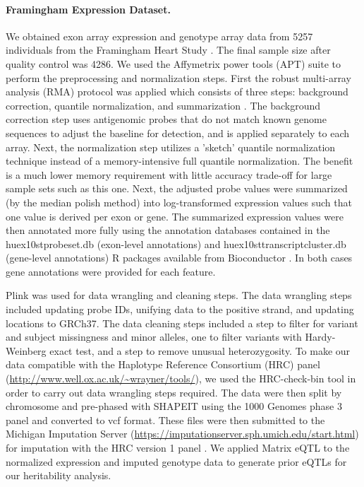 \documentclass[10pt,letterpaper]{article}
\begin{document}
\paragraph*{Framingham Expression Dataset.}\label{framingham-dataset}

We obtained exon array expression and genotype array data from 5257 individuals from the Framingham Heart Study \cite{Zhang_2015}. The final sample size after quality control was 4286. We used the Affymetrix power tools (APT) suite to perform the preprocessing and normalization steps. First the robust multi-array analysis (RMA) protocol was applied which consists of three steps: background correction, quantile normalization, and summarization \cite{irizarry2003summaries}. The background correction step uses antigenomic probes that do not match known genome sequences to adjust the baseline for detection, and is applied separately to each array. Next, the normalization step utilizes a 'sketch' quantile normalization technique instead of a memory-intensive full quantile normalization. The benefit is a much lower memory requirement with little accuracy trade-off for large sample sets such as this one. Next, the adjusted probe values were summarized (by the median polish method) into log-transformed expression values such that one value is derived per exon or gene. The summarized expression values were then annotated more fully using the annotation databases contained in the huex10stprobeset.db (exon-level annotations) and huex10sttranscriptcluster.db (gene-level annotations) R packages available from Bioconductor \cite{MacDonald_1,MacDonald_2}. In both cases gene annotations were provided for each feature. 

Plink \cite{chang2015second} was used for data wrangling and cleaning steps. The data wrangling steps included updating probe IDs, unifying data to the positive strand, and updating locations to GRCh37. The data cleaning steps included a step to filter for variant and subject missingness and minor alleles, one to filter variants with Hardy-Weinberg exact test, and a step to remove unusual heterozygosity. To make our data compatible with the Haplotype Reference Consortium (HRC) panel (\url{http://www.well.ox.ac.uk/~wrayner/tools/}), we used the HRC-check-bin tool in order to carry out data wrangling steps required. The data were then split by chromosome and pre-phased with SHAPEIT \cite{delaneau2012linear} using the 1000 Genomes phase 3 panel and converted to vcf format. These files were then submitted to the Michigan Imputation Server (\url{https://imputationserver.sph.umich.edu/start.html}) \cite{Howie_2012,Fuchsberger_2014} for imputation with the HRC version 1 panel \cite{mccarthy2015reference}.  We applied Matrix eQTL \cite{shabalin2012matrix} to the normalized expression and imputed genotype data to generate prior eQTLs for our heritability analysis.
\end{document}
